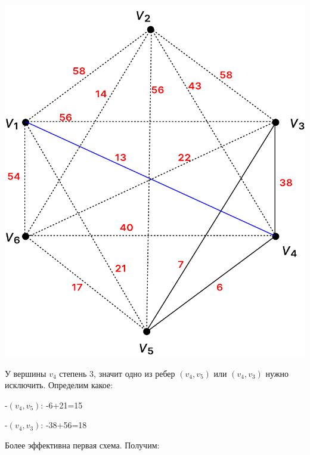 \documentclass[12pt]{article}
\begin{document}
\begin{center}
\includegraphics[scale=.6]{19_3.pdf}
\end{center}

У вершины $v_4$ степень 3, значит одно из ребер $(v_4, v_5)$ или $(v_4, v_3)$ нужно исключить. Определим какое:

-$(v_4, v_5)$: -6+21=15

-$(v_4, v_3)$: -38+56=18

Более эффективна первая схема. Получим:
\end{document}
